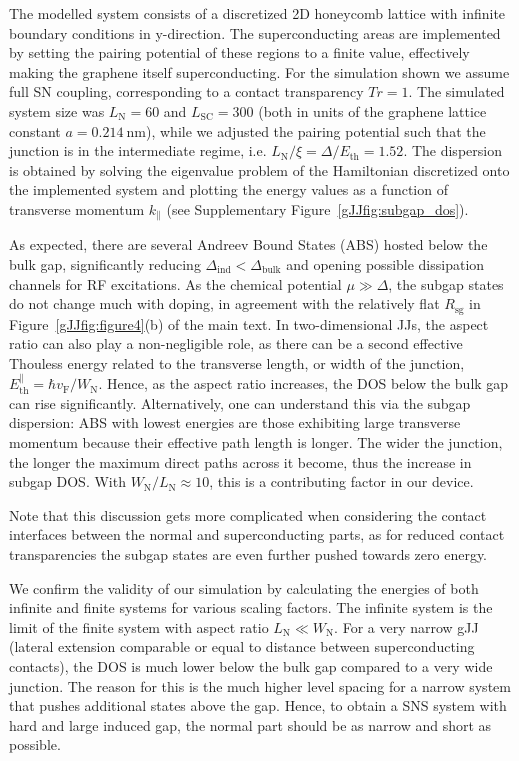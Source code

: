 The modelled system consists of a discretized 2D honeycomb lattice with infinite boundary conditions in y-direction.
The superconducting areas are implemented by setting the pairing potential of these regions to a finite value, effectively making the graphene itself superconducting.
For the simulation shown we assume full SN coupling, corresponding to a contact transparency $Tr=1$.
The simulated system size was $L_\text{N}=60$ and $L_\text{SC}=300$ (both in units of the graphene lattice constant $a=\SI{0.214}{\nano\meter}$), while we adjusted the pairing potential such that the junction is in the intermediate regime, i.e. $L_\text{N}/\xi=\Delta/E_\text{th} = 1.52$.
The dispersion is obtained by solving the eigenvalue problem of the Hamiltonian discretized onto the implemented system and plotting the energy values as a function of transverse momentum $k_\parallel$ (see Supplementary Figure~\ref{gJJfig:subgap_dos}).

As expected, there are several Andreev Bound States (ABS) hosted below the bulk gap, significantly reducing $\Delta_\text{ind}<\Delta_\text{bulk}$ and opening possible dissipation channels for RF excitations.
As the chemical potential $\mu\gg\Delta$, the subgap states do not change much with doping, in agreement with the relatively flat $R_\text{sg}$ in Figure~\ref{gJJfig:figure4}(b) of the main text.
In two-dimensional JJs, the aspect ratio can also play a non-negligible role, as there can be a second effective Thouless energy related to the transverse length, or width of the junction, $E_\text{th}^\parallel=\hbar v_\text{F}/W_\text{N}$.
Hence, as the aspect ratio increases, the DOS below the bulk gap can rise significantly.
Alternatively, one can understand this via the subgap dispersion:
ABS with lowest energies are those exhibiting large transverse momentum because their effective path length is longer.
The wider the junction, the longer the maximum direct paths across it become, thus the increase in subgap DOS.
With $W_\text{N}/L_\text{N}\approx10$, this is a contributing factor in our device.

Note that this discussion gets more complicated when considering the contact interfaces between the normal and superconducting parts, as for reduced contact transparencies the subgap states are even further pushed towards zero energy.

We confirm the validity of our simulation by calculating the energies of both infinite and finite systems for various scaling factors.
The infinite system is the limit of the finite system with aspect ratio $L_\text{N} \ll W_\text{N}$.
For a very narrow gJJ (lateral extension comparable or equal to distance between superconducting contacts), the DOS is much lower below the bulk gap compared to a very wide junction.
The reason for this is the much higher level spacing for a narrow system that pushes additional states above the gap.
Hence, to obtain a SNS system with hard and large induced gap, the normal part should be as narrow and short as possible.

